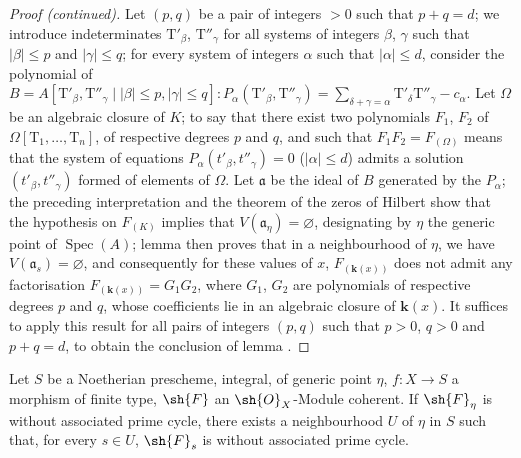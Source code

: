 \begin{proof}[Proof (continued)]
Let $(p,q)$ be a pair of integers $>0$ such that $p+q=d$; we introduce indeterminates $\mathrm{T}'_\beta$, $\mathrm{T}''_\gamma$ for all systems of integers $\beta$, $\gamma$ such that $|\beta|\leqslant p$ and $|\gamma|\leqslant q$; for every system of integers $\alpha$ such that $|\alpha|\leqslant d$, consider the polynomial of $B=A[\mathrm{T}'_\beta, \mathrm{T}''_\gamma \mid |\beta|\leqslant p, |\gamma|\leqslant q]: P_\alpha(\mathrm{T}'_\beta,\mathrm{T}''_\gamma)=\sum_{\delta+\gamma=\alpha}\mathrm{T}'_\delta \mathrm{T}''_\gamma-c_\alpha$.
Let $\Omega$ be an algebraic closure of $K$; to say that there exist two polynomials $F_1$, $F_2$ of $\Omega[\mathrm{T}_1,\ldots,\mathrm{T}_n]$, of respective degrees $p$ and $q$, and such that $F_1 F_2=F_{(\Omega)}$ means that the system of equations $P_\alpha(t'_\beta,t''_\gamma)=0$ ($|\alpha|\leqslant d$) admits a solution $(t'_\beta,t''_\gamma)$ formed of elements of $\Omega$.
Let $\mathfrak{a}$ be the ideal of $B$ generated by the $P_\alpha$; the preceding interpretation and the theorem of the zeros of Hilbert show that the hypothesis on $F_{(K)}$ implies that $V(\mathfrak{a}_\eta)=\varnothing$, designating by $\eta$ the generic point of $\operatorname{Spec}(A)$; lemma  then proves that in a neighbourhood of $\eta$, we have $V(\mathfrak{a}_s)=\varnothing$, and consequently for these values of $x$, $F_{(\boldsymbol{k}(x))}$ does not admit any factorisation $F_{(\boldsymbol{k}(x))}=G_1 G_2$, where $G_1$, $G_2$ are polynomials of respective degrees $p$ and $q$, whose coefficients lie in an algebraic closure of $\boldsymbol{k}(x)$.
It suffices to apply this result for all pairs of integers $(p,q)$ such that $p>0$, $q>0$ and $p+q=d$, to obtain the conclusion of lemma .
\end{proof}

\begin{proposition}[9.7.6]
\label{IV.9.7.6}
Let $S$ be a Noetherian prescheme, integral, of generic point $\eta$, $f:X\to S$ a morphism of finite type, $\sh{F}$ an $\sh{O}_X$-Module coherent.
If $\sh{F}_\eta$ is without associated prime cycle, there exists a neighbourhood $U$ of $\eta$ in $S$ such that, for every $s\in U$, $\sh{F}_s$ is without associated prime cycle.
\end{proposition}

